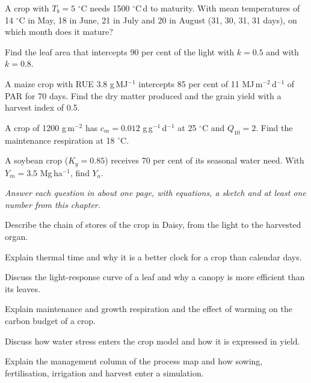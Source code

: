 \begin{exlist}
\item A crop with $T_b=5$ $^\circ$C needs 1500 $^\circ$C\,d to maturity. With mean temperatures of 14 $^\circ$C in May, 18 in June, 21 in July and 20 in August (31, 30, 31, 31 days), on which month does it mature?
\item Find the leaf area that intercepts 90 per cent of the light with $k=0.5$ and with $k=0.8$.
\item A maize crop with RUE 3.8 g\,MJ$^{-1}$ intercepts 85 per cent of 11 MJ\,m$^{-2}$\,d$^{-1}$ of PAR for 70 days. Find the dry matter produced and the grain yield with a harvest index of 0.5.
\item A crop of 1200 g\,m$^{-2}$ has $c_m=0.012$ g\,g$^{-1}$\,d$^{-1}$ at 25 $^\circ$C and $Q_{10}=2$. Find the maintenance respiration at 18 $^\circ$C.
\item A soybean crop ($K_y=0.85$) receives 70 per cent of its seasonal water need. With $Y_m=3.5$ Mg\,ha$^{-1}$, find $Y_a$.
\end{exlist}
{\small\itshape Answer each question in about one page, with equations, a sketch and at least one number from this chapter.}\par\vspace{3pt}
\begin{exlist}
\item Describe the chain of stores of the crop in Daisy, from the light to the harvested organ.
\item Explain thermal time and why it is a better clock for a crop than calendar days.
\item Discuss the light-response curve of a leaf and why a canopy is more efficient than its leaves.
\item Explain maintenance and growth respiration and the effect of warming on the carbon budget of a crop.
\item Discuss how water stress enters the crop model and how it is expressed in yield.
\item Explain the management column of the process map and how sowing, fertilisation, irrigation and harvest enter a simulation.
\end{exlist}

